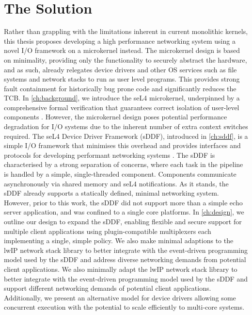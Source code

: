 \section{The Solution}
Rather than grappling with the limitations inherent in current monolithic kernels,
this thesis proposes developing a high performance networking system using a novel I/O framework on
a microkernel instead. The microkernel design is based on minimality, providing only the functionality to
securely abstract the hardware, and as such, already relegates device drivers and
other OS services such as file systems and network stacks to run as user level programs. This provides
strong fault containment for historically bug prone code and significantly reduces the TCB.
In \autoref{ch:background}, we introduce the seL4 microkernel, underpinned by a comprehensive formal verification
that guarantees correct isolation of user-level components \cite{Klein_AEMSKH_14}.
However, the microkernel design poses potential performance degradation for I/O systems due to the
inherent number of extra context switches required. The seL4 Device Driver
Framework (sDDF), introduced in \autoref{ch:sddf}, is a simple I/O framework that minimises this overhead
and provides interfaces and protocols for developing performant networking systems \cite{Parker_22:sddf}. The sDDF
is characterised by a strong separation of concerns, where each task in the pipeline is handled by a simple, single-threaded
component. Components communicate asynchronously via shared memory and seL4 notifications. As it stands, the sDDF
already supports a statically defined, minimal networking system. However, prior to this work, the sDDF did not support more than a simple echo 
server application, and was confined to a single core platforms. In \autoref{ch:design}, we outline our design to expand
the sDDF, enabling flexible and secure support for multiple client applications using plugin-compatible
multiplexers each implementing a single, simple policy. We also make minimal adaptions to the lwIP \cite{Dunkels_01} 
network stack library to better integrate with the event-driven programming model used by the sDDF and address diverse
networking demands from potential client applications. We also minimally adapt the lwIP \cite{Dunkels_01} network
stack library to better integrate with the event-driven programming model used by the sDDF and support 
different networking demands of potential client applications. Additionally, we present an alternative model for
device drivers allowing some concurrent execution with the potential to scale efficiently to multi-core systems.
